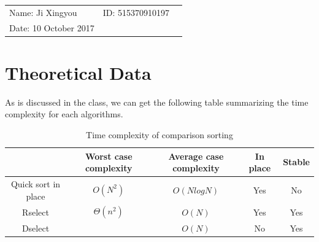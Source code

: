 \documentclass{article}
\begin{document}
\begin{spacing}{2.0}
\vspace*{0.25cm}

\hrulefill

\thispagestyle{empty}

\begin{center}
\begin{large}
\end{large}

\hrulefill

\vspace*{5cm}
\begin{Large}
\end{Large}

\vspace{2em}

\end{center}


\vfill

\begin{table}[h!]
\flushleft
\begin{tabular}{lll}
Name: Ji Xingyou \hspace*{2em}&
ID: 515370910197\hspace*{2em}
\\

Date: 10 October 2017

\end{tabular}
\end{table}

\hfill

\newpage
\tableofcontents
\newpage
\section{Theoretical Data}
\indent As is discussed in the class, we can get the following table summarizing the time complexity for each algorithms.

\begin{table}[!hbp]
\centering
\begin{tabular}{ccccc}
&Worst case complexity&Average case complexity&In place&Stable\\
\hline
\hline
Quick sort in place&$O(N^2)$&$O(NlogN)$&Yes&No\\
\hline
Rselect&$\Theta(n^2)$&$O(N)$&Yes&Yes\\
\hline
Dselect&&$O(N)$&No&Yes\\
\hline
\end{tabular}
\caption{Time complexity of comparison sorting}
\end{table}


\end{spacing}
\end{document}
